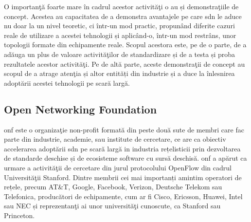 O importanţă foarte mare în cadrul acestor activităţi o au și demonstraţiile de concept. Acestea au capacitatea de a demonstra avantajele pe care \gls{sdn} le aduce nu doar la un nivel teoretic, ci într-un mod practic, propunând diferite cazuri reale de utilizare a acestei tehnologii și aplicând-o, într-un mod restrâns, unor topologii formate din echipamente reale. Scopul acestora este, pe de o parte, de a adăuga un plus de valoare activităţilor de standardizare și de a testa și proba rezultatele acestor activităţi. Pe de altă parte, aceste demonstraţii de concept au scopul de a atrage atenţia și altor entități din industrie și a duce la înlesnirea adoptării acestei tehnologii pe scară largă.

\subsection{Open Networking Foundation}

\gls{onf} este o organizaţie non-profit formată din peste două sute de membri care fac parte din industrie, academie, sau institute de cercetare, ce are ca obiectiv accelerarea adoptării \gls{sdn} pe scară largă in industria rețelisticii prin dezvoltarea de standarde deschise și de ecosisteme software cu sursă deschisă. \gls{onf} a apărut ca urmare a activităţii de cercetare din jurul protocolului OpenFlow din cadrul Universităţii Stanford. Dintre membrii cei mai importanți amintim operatori de rețele, precum AT\&T, Google, Facebook, Verizon, Deutsche Telekom sau Telefonica, producători de echipamente, cum ar fi Cisco, Ericsson, Huawei, Intel sau NEC și reprezentanţi ai unor universităţi cunoscute, ca Stanford sau Princeton.

